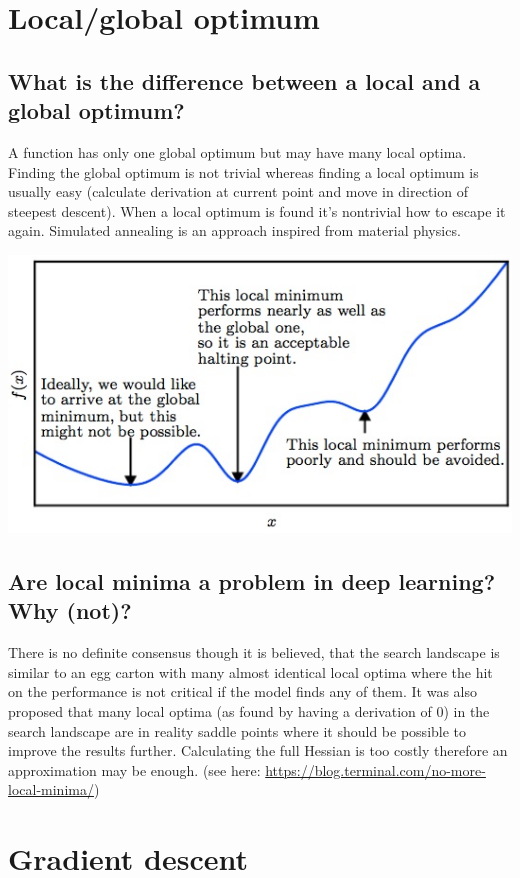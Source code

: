 \section{Local/global optimum}
\subsection{What is the difference between a local and a global optimum?}
A function has only one global optimum but may have many local optima. Finding the global optimum is not trivial whereas finding a local optimum is usually easy (calculate derivation at current point and move in direction of steepest descent). When a local optimum is found it's nontrivial how to escape it again. Simulated annealing is an approach inspired from material physics.

\includegraphics[width=\textwidth]{./img/localopt.jpeg}
\subsection{Are local minima a problem in deep learning?  Why (not)?}
There is no definite consensus though it is believed, that the search landscape is similar to an egg carton with many almost identical local optima where the hit on the performance is not critical if the model finds any of them. It was also proposed that many local optima (as found by having a derivation of 0) in the search landscape are in reality saddle points where it should be possible to improve the results further. Calculating the full Hessian is too costly therefore an approximation may be enough. (see here: \url{https://blog.terminal.com/no-more-local-minima/})
%
\section{Gradient descent}
